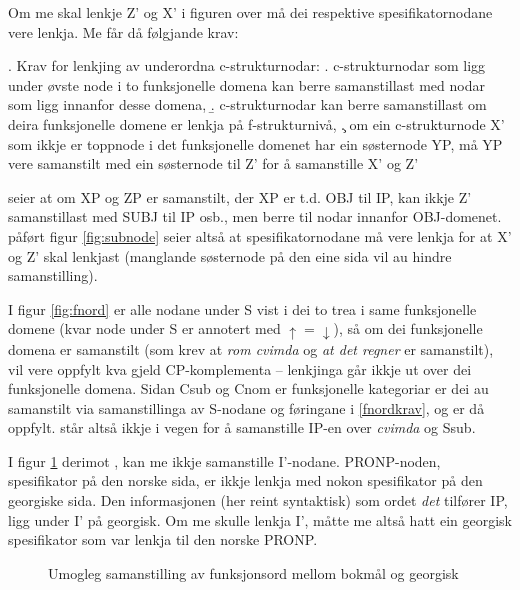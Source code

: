 \documentclass[11pt,a4paper,oneside,draft]{book}
\begin{document}
Om me skal lenkje Z' og X' i figuren over må dei respektive
spesifikatornodane vere lenkja. Me får då følgjande krav:

\ex. \label{subnodekrav} Krav for lenkjing av underordna
c-strukturnodar:
\a. c-strukturnodar som ligg under øvste node i to funksjonelle
    domena kan berre samanstillast med nodar som ligg innanfor desse
    domena,
\b. c-strukturnodar kan berre samanstillast om deira funksjonelle
    domene er lenkja på f-strukturnivå,
\c. om ein c-strukturnode X' som ikkje er toppnode i det funksjonelle
    domenet har ein søsternode YP, må YP vere samanstilt med ein
    søsternode til Z' for å samanstille X' og Z'


\Last[a] seier at om XP og ZP er samanstilt, der XP er t.d. OBJ til
IP, kan ikkje Z' samanstillast med SUBJ til IP osb., men berre til
nodar innanfor OBJ-domenet. \Last[c] påført figur \ref{fig:subnode}
seier altså at spesifikatornodane må vere lenkja for at X' og Z' skal
lenkjast (manglande søsternode på den eine sida vil au hindre
samanstilling).

I figur \ref{fig:fnord} er alle nodane under S vist i dei to trea i
same funksjonelle domene (kvar node under S er annotert med $\uparrow
= \downarrow$), så om dei funksjonelle domena er samanstilt (som krev
at \emph{rom cvimda} og \emph{at det regner} er samanstilt), vil \Last[a og -b]
vere oppfylt kva gjeld CP-komplementa -- lenkjinga går ikkje ut over
dei funksjonelle domena. Sidan Csub og Cnom er funksjonelle kategoriar
er dei au samanstilt via samanstillinga av S-nodane og føringane i
\ref{fnordkrav}, og \Last[c] er då oppfylt. \Last står altså ikkje i
vegen for å samanstille IP-en over \emph{cvimda} og Ssub.

I figur \ref{fig:ikkjesub} derimot \citep{mrs-suite}, kan me ikkje
samanstille I'-nodane. PRONP-noden, spesifikator på den norske sida,
er ikkje lenkja med nokon spesifikator på den georgiske sida. Den
informasjonen (her reint syntaktisk) som ordet \emph{det} tilfører IP, ligg
under I' på georgisk. Om me skulle lenkja I', måtte me altså hatt ein
georgisk spesifikator som var lenkja til den norske PRONP.

\begin{figure}[htp]
 \vfill{} %
\caption{Umogleg samanstilling av funksjonsord mellom bokmål og georgisk}
 \label{fig:ikkjesub}
\end{figure}
\end{document}
